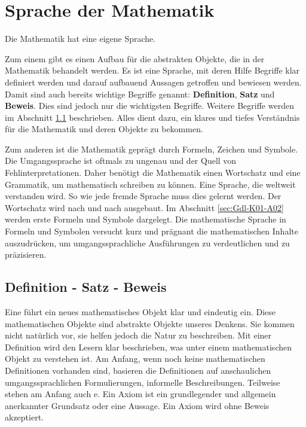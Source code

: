 
\chapter{Sprache der Mathematik}
\label{cha:Gdl-K01-Sprache}

Die Mathematik hat eine eigene Sprache. 

Zum einem gibt es einen Aufbau für die abstrakten Objekte, die in der 
Mathematik behandelt werden. Es ist eine Sprache, mit deren Hilfe Begriffe 
klar definiert werden und darauf aufbauend Aussagen getroffen und bewiesen 
werden. Damit sind auch bereits wichtige Begriffe genannt: 
\textbf{Definition}, \textbf{Satz} und \textbf{Beweis}. Dies sind jedoch nur 
die wichtigsten Begriffe. Weitere Begriffe werden im Abschnitt 
\ref{sec:Gdl-K01-A01} beschrieben. Alles dient dazu, ein klares und tiefes
Verständnis für die Mathematik und deren Objekte zu bekommen. 

Zum anderen ist die Mathematik geprägt durch Formeln, Zeichen und Symbole. 
Die Umgangssprache ist oftmals zu ungenau und der Quell von
Fehlinterpretationen. Daher benötigt die Mathematik einen Wortschatz und eine
Grammatik, um mathematisch schreiben zu können. Eine Sprache, die weltweit
verstanden wird. 
So wie jede fremde Sprache muss dies gelernt werden. Der Wortschatz wird nach 
und nach ausgebaut. Im Abschnitt \ref{sec:Gdl-K01-A02} werden erste Formeln 
und Symbole dargelegt. Die mathematische Sprache in Formeln und Symbolen 
versucht kurz und prägnant die mathematischen Inhalte auszudrücken, um
umgangssprachliche Ausführungen zu verdeutlichen und zu präzisieren.

\section{Definition - Satz - Beweis}
\label{sec:Gdl-K01-A01}

\begin{Unit}
Eine  führt ein neues mathematisches Objekt klar und 
eindeutig ein. Diese mathematischen Objekte sind abstrakte Objekte unseres 
Denkens. Sie kommen nicht natürlich vor, sie helfen jedoch die Natur zu 
beschreiben. Mit einer Definition wird den Lesern klar beschrieben, was unter 
einem mathematischen Objekt zu verstehen ist. Am Anfang, wenn noch keine
mathematischen Definitionen vorhanden sind, basieren die Definitionen auf
anschaulichen umgangssprachlichen Formulierungen, informelle Beschreibungen.
Teilweise stehen am Anfang auch e. Ein Axiom ist ein 
grundlegender und allgemein anerkannter Grundsatz oder eine Aussage. Ein Axiom 
wird ohne Beweis akzeptiert.
\end{Unit}


